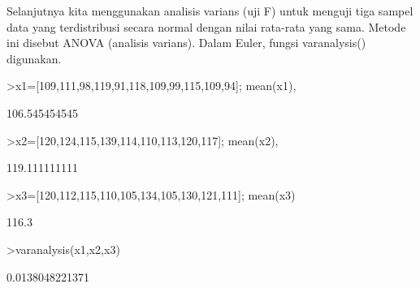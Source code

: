 \documentclass[a4paper,10pt]{article}
\begin{document}
\begin{eulernotebook}
\begin{eulercomment}
\begin{eulercomment}
\begin{eulercomment}
\begin{eulercomment}
\begin{eulercomment}
\begin{eulercomment}
\begin{eulercomment}
\begin{eulercomment}
\begin{eulercomment}
\begin{eulercomment}
\begin{eulercomment}
\begin{eulercomment}
\begin{eulercomment}
\begin{eulercomment}
\begin{eulercomment}
\begin{eulercomment}
\begin{eulercomment}
\begin{eulercomment}
\begin{eulercomment}
\begin{eulercomment}
\begin{eulercomment}
\begin{eulercomment}
\begin{eulercomment}
\begin{eulercomment}
\begin{eulercomment}
\begin{eulercomment}
\begin{eulercomment}
\begin{eulercomment}
\begin{eulercomment}
\begin{eulercomment}
\begin{eulercomment}
\begin{eulercomment}
\begin{eulercomment}
\begin{eulercomment}
\begin{eulercomment}
\begin{eulercomment}
\begin{eulercomment}
\begin{eulercomment}
\begin{eulercomment}
\begin{eulercomment}
\begin{eulercomment}
\begin{eulercomment}
\begin{eulercomment}
\begin{eulercomment}
\begin{eulercomment}
\begin{eulercomment}
\begin{eulercomment}
Selanjutnya kita menggunakan analisis varians (uji F) untuk menguji
tiga sampel data yang terdistribusi secara normal dengan nilai
rata-rata yang sama. Metode ini disebut ANOVA (analisis varians).
Dalam Euler, fungsi varanalysis() digunakan.
\end{eulercomment}
\begin{eulerprompt}
>x1=[109,111,98,119,91,118,109,99,115,109,94]; mean(x1),
\end{eulerprompt}
\begin{euleroutput}
  106.545454545
\end{euleroutput}
\begin{eulerprompt}
>x2=[120,124,115,139,114,110,113,120,117]; mean(x2),
\end{eulerprompt}
\begin{euleroutput}
  119.111111111
\end{euleroutput}
\begin{eulerprompt}
>x3=[120,112,115,110,105,134,105,130,121,111]; mean(x3)
\end{eulerprompt}
\begin{euleroutput}
  116.3
\end{euleroutput}
\begin{eulerprompt}
>varanalysis(x1,x2,x3)
\end{eulerprompt}
\begin{euleroutput}
  0.0138048221371

\end{euleroutput}
\end{eulercomment}
\end{eulercomment}
\end{eulercomment}
\end{eulercomment}
\end{eulercomment}
\end{eulercomment}
\end{eulercomment}
\end{eulercomment}
\end{eulercomment}
\end{eulercomment}
\end{eulercomment}
\end{eulercomment}
\end{eulercomment}
\end{eulercomment}
\end{eulercomment}
\end{eulercomment}
\end{eulercomment}
\end{eulercomment}
\end{eulercomment}
\end{eulercomment}
\end{eulercomment}
\end{eulercomment}
\end{eulercomment}
\end{eulercomment}
\end{eulercomment}
\end{eulercomment}
\end{eulercomment}
\end{eulercomment}
\end{eulercomment}
\end{eulercomment}
\end{eulercomment}
\end{eulercomment}
\end{eulercomment}
\end{eulercomment}
\end{eulercomment}
\end{eulercomment}
\end{eulercomment}
\end{eulercomment}
\end{eulercomment}
\end{eulercomment}
\end{eulercomment}
\end{eulercomment}
\end{eulercomment}
\end{eulercomment}
\end{eulercomment}
\end{eulercomment}
\end{eulernotebook}
\end{document}
